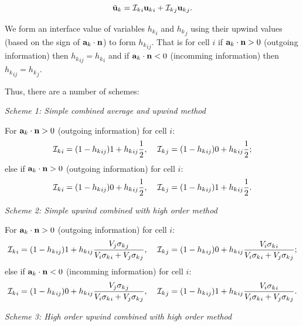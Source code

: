\begin{equation}
{\tilde{\bf u}_k} = {{\cal I}_k}_i  {{\bf u}_k}_i + {{\cal I}_k}_j {{\bf u}_k}_j.
\end{equation}

We form an interface value of variables ${h_k}_{i}$ and ${h_k}_{j}$ using their upwind values (based on the sign of
${\bf a}_k\cdot {\bf n}$) to form ${h_k}_{ij}$. That is for cell $i$ if ${\bf a}_k\cdot {\bf n}>0$ (outgoing information)
then
${h_k}_{ij}= {h_k}_{i}$ and if ${\bf a}_k\cdot {\bf n}<0$ (incomming information) then
${h_k}_{ij}= {h_k}_{j}$.

Thus,  there are a number of schemes:

\noindent
{\it Scheme 1: Simple combined average and upwind method}

\noindent
For ${\bf a}_k\cdot {\bf n}>0$ (outgoing information) for cell $i$:
\begin{equation}
{{\cal I}_k}_i = (1-{h_k}_{ij}) 1 + {h_k}_{ij}\frac{1}{2},   \;\;\;\;
{{\cal I}_k}_j = (1-{h_k}_{ij}) 0 + {h_k}_{ij}\frac{1}{2};
\end{equation}
else if ${\bf a}_k\cdot {\bf n}>0$ (outgoing information) for cell $i$:
\begin{equation}
{{\cal I}_k}_i = (1-{h_k}_{ij}) 0 + {h_k}_{ij}\frac{1}{2},   \;\;\;\;
{{\cal I}_k}_j = (1-{h_k}_{ij}) 1 + {h_k}_{ij}\frac{1}{2}.
\end{equation}


\vspace{1cm}
\noindent
{\it Scheme 2: Simple upwind combined with high order method}

\noindent
For ${\bf a}_k\cdot {\bf n}>0$ (outgoing information) for cell $i$:
\begin{equation}
{{\cal I}_k}_i = (1-{h_k}_{ij}) 1 + {h_k}_{ij}\frac{ V_j{\sigma_k}_j }{ V_i{\sigma_k}_i + V_j{\sigma_k}_j },  \;\;\;\;
{{\cal I}_k}_j = (1-{h_k}_{ij}) 0 + {h_k}_{ij}\frac{ V_i{\sigma_k}_i }{ V_i{\sigma_k}_i + V_j{\sigma_k}_j };
\end{equation}
else if ${\bf a}_k\cdot {\bf n}<0$ (incomming information) for cell $i$:
\begin{equation}
{{\cal I}_k}_i = (1-{h_k}_{ij}) 0 + {h_k}_{ij}\frac{ V_j{\sigma_k}_j }{ V_i{\sigma_k}_i + V_j{\sigma_k}_j },  \;\;\;\;
{{\cal I}_k}_j = (1-{h_k}_{ij}) 1 + {h_k}_{ij}\frac{ V_i{\sigma_k}_i }{ V_i{\sigma_k}_i + V_j{\sigma_k}_j }.
\end{equation}

\vspace{1cm}
\noindent
{\it Scheme 3: High order upwind combined with high order method}

